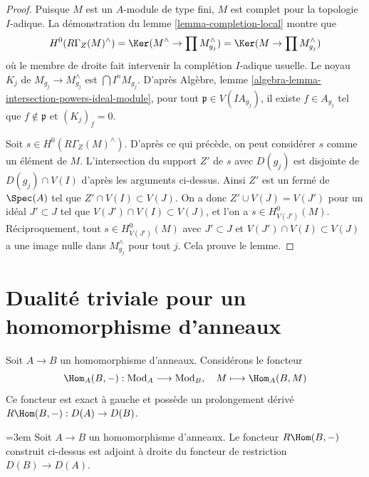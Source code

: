 \begin{proof}
Puisque $M$ est un $A$-module de type fini, $M$
est complet pour la topologie $I$-adique.
La démonstration du lemme \ref{lemma-completion-local} montre que
$$
H^0(R\Gamma_Z(M)^\wedge) =
\Ker(M^\wedge \to \prod M_{g_j}^\wedge) =
\Ker(M \to \prod M_{g_j}^\wedge)
$$
où le membre de droite fait intervenir la complétion $I$-adique usuelle.
Le noyau $K_j$ de $M_{g_j} \to M_{g_j}^\wedge$ est $\bigcap I^n M_{g_j}$.
D'après Algèbre, lemme \ref{algebra-lemma-intersection-powers-ideal-module},
pour tout $\mathfrak p \in V(IA_{g_j})$, il existe $f \in A_{g_j}$ tel que $f \not \in \mathfrak p$ et $(K_j)_f = 0$.

\medskip\noindent
Soit $s \in H^0(R\Gamma_Z(M)^\wedge)$.
D'après ce qui précède, on peut considérer $s$ comme un élément de $M$.
L'intersection du support $Z'$ de $s$ avec $D(g_j)$
est disjointe de $D(g_j) \cap V(I)$ d'après les arguments ci-dessus.
Ainsi $Z'$ est un fermé de $\Spec(A)$ tel que $Z' \cap V(I) \subset V(J)$.
On a donc $Z' \cup V(J) = V(J')$ pour un idéal $J' \subset J$ tel que $V(J') \cap V(I) \subset V(J)$,
et l'on a $s \in H^0_{V(J')}(M)$.
Réciproquement, tout $s \in H^0_{V(J')}(M)$ avec $J' \subset J$ et $V(J') \cap V(I) \subset V(J)$
a une image nulle dans $M_{g_j}^\wedge$ pour tout $j$.
Cela prouve le lemme.
\end{proof}









\section{Dualité triviale pour un homomorphisme d'anneaux}
\label{section-trivial}

\noindent
Soit $A \to B$ un homomorphisme d'anneaux. Considérons le foncteur
$$
\Hom_A(B, -) : \text{Mod}_A \longrightarrow \text{Mod}_B,\quad
M \longmapsto \Hom_A(B, M)
$$
Ce foncteur est exact à gauche et possède un prolongement dérivé
$R\Hom(B, -) : D(A) \to D(B)$.

\begin{lemma}
\label{lemma-right-adjoint}
{\emergencystretch=3em Soit $A \to B$ un homomorphisme d'anneaux. Le foncteur $R\Hom(B, -)$
construit ci-dessus est adjoint à droite du foncteur de restriction
$D(B) \to D(A)$.\par}
\end{lemma}

